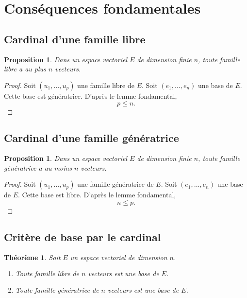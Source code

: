\documentclass[11pt,a4paper]{article}
\newtheorem{theoreme}[definition]{Théorème}
\newtheorem{proposition}[definition]{Proposition}
\theoremstyle{remark}
\begin{document}
\section{Conséquences fondamentales}

\subsection{Cardinal d’une famille libre}

\begin{proposition}
Dans un espace vectoriel \(E\) de dimension finie \(n\), toute famille libre a au plus \(n\) vecteurs.
\end{proposition}

\begin{proof}
Soit \((u_1,\dots,u_p)\) une famille libre de \(E\). Soit \((e_1,\dots,e_n)\) une base de \(E\). Cette base est génératrice. D’après le lemme fondamental,
\[
p\le n.
\]
\end{proof}

\subsection{Cardinal d’une famille génératrice}

\begin{proposition}
Dans un espace vectoriel \(E\) de dimension finie \(n\), toute famille génératrice a au moins \(n\) vecteurs.
\end{proposition}

\begin{proof}
Soit \((u_1,\dots,u_p)\) une famille génératrice de \(E\). Soit \((e_1,\dots,e_n)\) une base de \(E\). Cette base est libre. D’après le lemme fondamental,
\[
n\le p.
\]
\end{proof}

\subsection{Critère de base par le cardinal}

\begin{theoreme}
Soit \(E\) un espace vectoriel de dimension \(n\).

\begin{enumerate}[label=\arabic*)]
    \item Toute famille libre de \(n\) vecteurs est une base de \(E\).
    \item Toute famille génératrice de \(n\) vecteurs est une base de \(E\).
\end{enumerate}
\end{theoreme}
\end{document}

